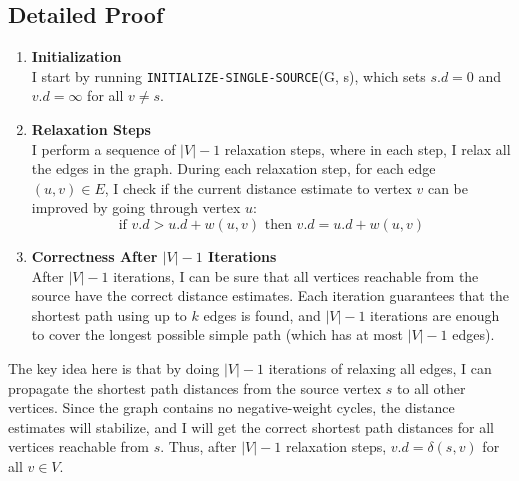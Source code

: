 \documentclass[10pt,letter,notitlepage]{article}
\begin{document}
\begin{Answer}
\subsection*{Detailed Proof}

\begin{enumerate}
    \item \textbf{Initialization} \\
    I start by running \texttt{INITIALIZE-SINGLE-SOURCE}(G, s), which sets \( s.d = 0 \) and \( v.d = \infty \) for all \( v \neq s \).

    \item \textbf{Relaxation Steps} \\
    I perform a sequence of \textbf{\(|V| - 1\)} relaxation steps, where in each step, I relax all the edges in the graph.
    During each relaxation step, for each edge \( (u, v) \in E \), I check if the current distance estimate to vertex \( v \) can be improved by going through vertex \( u \):
    \[
    \text{if } v.d > u.d + w(u, v) \text{ then } v.d = u.d + w(u, v)
    \]

    \item \textbf{Correctness After \( |V| - 1 \) Iterations} \\
    After \( |V| - 1 \) iterations, I can be sure that all vertices reachable from the source have the correct distance estimates.
    Each iteration guarantees that the shortest path using up to \( k \) edges is found, and \( |V| - 1 \) iterations are enough to cover the longest possible simple path (which has at most \( |V| - 1 \) edges).
\end{enumerate}


\par The key idea here is that by doing \textbf{\(|V| - 1\)} iterations of relaxing all edges, I can propagate the shortest path distances from the source vertex \( s \) to all other vertices. Since the graph contains no negative-weight cycles, the distance estimates will stabilize, and I will get the correct shortest path distances for all vertices reachable from \( s \). Thus, after \( |V| - 1 \) relaxation steps, \( v.d = \delta(s, v) \) for all \( v \in V \).


\end{Answer}
\end{document}
